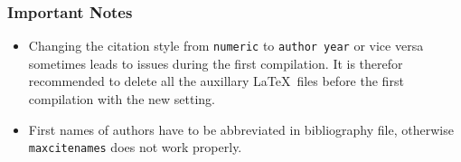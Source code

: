 			\subsubsection{Important Notes}
				\begin{itemize}
					\item Changing the citation style from \verb|numeric| to \verb|author year| or vice versa sometimes leads to issues during the first compilation. It is therefor recommended to delete all the auxillary \LaTeX~files before the first compilation with the new setting.
					\item First names of authors have to be abbreviated in bibliography file, otherwise \verb|maxcitenames| does not work properly.
				\end{itemize} 